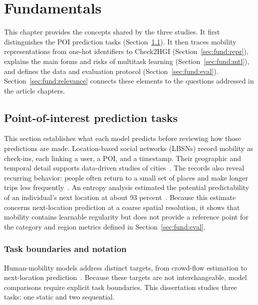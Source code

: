 

\chapter{Fundamentals}
\label{ch:fundamentals}

This chapter provides the concepts shared by the three studies. It first distinguishes
the POI prediction tasks (Section~\ref{sec:fund:tasks}). It then traces mobility
representations from one-hot identifiers to Check2HGI
(Section~\ref{sec:fund:repr}), explains the main forms and risks of multitask learning
(Section~\ref{sec:fund:mtl}), and defines the data and evaluation protocol
(Section~\ref{sec:fund:eval}). Section~\ref{sec:fund:relevance} connects these
elements to the questions addressed in the article chapters.


\section{Point-of-interest prediction tasks}
\label{sec:fund:tasks}

This section establishes what each model predicts before reviewing how those
predictions are made. Location-based social networks (LBSNs) record mobility as
check-ins, each linking a user, a POI, and a timestamp. Their geographic and temporal
detail supports data-driven studies of cities~\cite{silva2019urbancomputing}. The
records also reveal recurring behavior: people often return to a small set of places
and make longer trips less frequently~\cite{cho2011gowalla}. An entropy analysis
estimated the potential predictability of an individual's next location at about 93
percent~\cite{song2010limits}. Because this estimate concerns next-location prediction
at a coarse spatial resolution, it shows that mobility contains learnable regularity
but does not provide a reference point for the category and region metrics defined in
Section~\ref{sec:fund:eval}.

\subsection{Task boundaries and notation}

Human-mobility models address distinct targets, from crowd-flow estimation to
next-location prediction~\cite{luca2021mobilitysurvey}. Because these targets are not
interchangeable, model comparisons require explicit task boundaries. This dissertation
studies three tasks: one static and two sequential.


